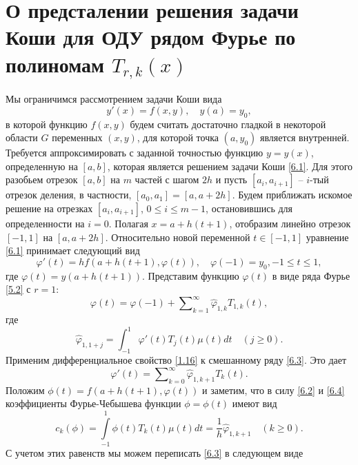 \section{О предсталении решения задачи Коши для ОДУ рядом Фурье по полиномам $T_{r,k}(x)$}
Мы ограничимся рассмотрением задачи Коши вида
\begin{equation}\label{6.1}
y'(x)=f(x,y), \quad y(a)=y_0,
\end{equation}
 в которой функцию   $f(x,y)$  будем считать достаточно гладкой в некоторой области $G$ переменных $(x,y)$, для которой точка $(a,y_0)$ является внутренней. Требуется аппроксимировать с заданной точностью  функцию $y=y(x)$, определенную на $[a,b]$, которая является решением задачи Коши \eqref{6.1}. Для этого разобьем отрезок $[a,b]$ на $m$ частей с шагом $2h$ и пусть $[a_i,a_{i+1}]$ -- $i$-тый отрезок деления, в частности, $[a_0,a_1]=[a,a+2h]$.
 Будем приближать искомое решение на отрезках $[a_i,a_{i+1}]$, $0\le i\le m-1$, остановившись для определенности на $i=0$.  Полагая $x=a+h(t+1)$, отобразим линейно отрезок $[-1,1]$ на $[a,a+2h]$. Относительно новой переменной $t\in [-1,1]$ уравнение \eqref{6.1} принимает следующий вид
\begin{equation}\label{6.2}
\varphi'(t)=hf(a+h(t+1),\varphi(t)), \quad \varphi(-1)=y_0, -1\le t\le 1,
\end{equation}
где $\varphi(t)=y(a+h(t+1))$. Представим функцию $\varphi(t)$ в виде ряда Фурье \eqref{5.2} с $r=1$:
\begin{equation}\label{6.3}
\varphi(t)= \varphi(-1)+ \sum\nolimits_{k=1}^\infty \hat \varphi_{1,k}T_{1,k}(t),
\end{equation}
где
  \begin{equation}\label{6.4}
\hat \varphi_{1,1+j}=\int_{-1}^1 \varphi'(t)T_{j}(t)\mu(t)dt\quad(j\ge0).
\end{equation}
Применим  дифференциальное свойство \eqref{1.16} к смешанному ряду \eqref{6.3}. Это дает
\begin{equation}\label{6.5}
\varphi'(t)=  \sum\nolimits_{k=0}^\infty \hat \varphi_{1,k+1}T_{k}(t).
\end{equation}
Положим $\phi(t)=f(a+h(t+1),\varphi(t))$ и заметим, что в силу \eqref{6.2} и \eqref{6.4} коэффициенты Фурье-Чебышева функции $\phi=\phi(t)$ имеют вид
\begin{equation}\label{6.6}
 c_k(\phi)=\int\limits_{-1}^1\phi(t)T_k(t)\mu(t)dt=\frac1h\hat \varphi_{1,k+1} \quad (k\ge0).
\end{equation}
С учетом этих равенств мы можем переписать \eqref{6.3} в следующем виде
